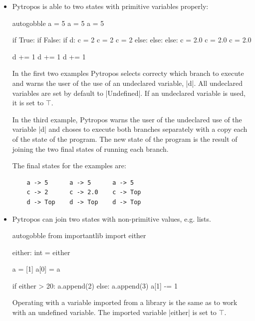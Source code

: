 \begin{itemize}
\tightlist
\item Pytropos is able to two states with primitive variables properly:

  \begin{pythoncode*}{autogobble}
  a = 5               a = 5               a = 5

  if True:            if False:           if d:
      c = 2               c = 2               c = 2
  else:               else:               else:
      c = 2.0             c = 2.0             c = 2.0

  d += 1              d += 1              d += 1
  \end{pythoncode*}

  In the first two examples Pytropos selects correcty which branch to execute and warns
  the user of the use of an undeclared variable, \pycode|d|.  All undeclared variables are
  set by default to \pycode|Undefined|. If an undeclared variable is used, it is set to
  $\top$.

  In the third example, Pytropos warns the user of the undeclared use of the variable
  \pycode|d| and choses to execute both branches separately with a copy each of the state
  of the program. The new state of the program is the result of joining the two final
  states of running each branch.

  The final states for the examples are:

  \begin{verbatim}
    a -> 5      a -> 5      a -> 5
    c -> 2      c -> 2.0    c -> Top
    d -> Top    d -> Top    d -> Top
  \end{verbatim}

\item Pytropos can join two states with non-primitive values, e.g. lists.

  \begin{pythoncode*}{autogobble}
    from importantlib import either

    either: int = either

    a = [1]
    a[0] = a

    if either > 20:
      a.append(2)
    else:
      a.append(3)
      a[1] -= 1
  \end{pythoncode*}

  Operating with a variable imported from a library is the same as to work with an
  undefined variable. The imported variable \pycode|either| is set to $\top$.


\end{itemize}
